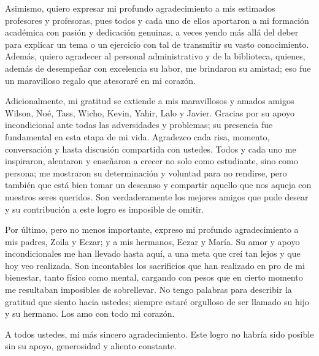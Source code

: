Asimismo, quiero expresar mi profundo agradecimiento a mis estimados profesores y profesoras, pues todos y cada uno de ellos aportaron a mi formación académica con pasión y dedicación genuinas, a veces yendo más allá del deber para explicar un tema o un ejercicio con tal de transmitir su vasto conocimiento. Además, quiero agradecer al personal administrativo y de la biblioteca, quienes, además de desempeñar con excelencia su labor, me brindaron su amistad; eso fue un maravilloso regalo que atesoraré en mi corazón.

Adicionalmente, mi gratitud se extiende a mis maravillosos y amados amigos Wilson, Noé, Tass, Wicho, Kevin, Yahir, Lalo y Javier. Gracias por su apoyo incondicional ante todas las adversidades y problemas; su presencia fue fundamental en esta etapa de mi vida. Agradezco cada risa, momento, conversación y hasta discusión compartida con ustedes. Todos y cada uno me inspiraron, alentaron y enseñaron a crecer no solo como estudiante, sino como persona; me mostraron su determinación y voluntad para no rendirse, pero también que está bien tomar un descanso y compartir aquello que nos aqueja con nuestros seres queridos. Son verdaderamente los mejores amigos que pude desear y su contribución a este logro es imposible de omitir.

Por último, pero no menos importante, expreso mi profundo agradecimiento a mis padres, Zoila y Eczar; y a mis hermanos, Eczar y María. Su amor y apoyo incondicionales me han llevado hasta aquí, a una meta que creí tan lejos y que hoy veo realizada. Son incontables los sacrificios que han realizado en pro de mi bienestar, tanto físico como mental, cargando con pesos que en cierto momento me resultaban imposibles de sobrellevar. No tengo palabras para describir la gratitud que siento hacia ustedes; siempre estaré orgulloso de ser llamado su hijo y su hermano. Los amo con todo mi corazón.

A todos ustedes, mi más sincero agradecimiento. Este logro no habría sido posible sin su apoyo, generosidad y aliento constante.
